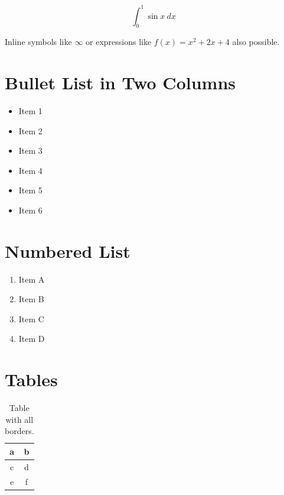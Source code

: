 \documentclass[12pt, a4paper]{book}
\begin{document}
$$\int_0^1{\sin x} \ dx$$

Inline symbols like $\infty$ or expressions like 
$f(x) = x^2 + 2x + 4$ also possible.

\section{Bullet List in Two Columns}

\begin{multicols}{2}
    \begin{itemize}
            \item Item 1
            \item Item 2
            \item Item 3
            \item Item 4
            \item Item 5
            \item Item 6
    \end{itemize}
\end{multicols}


\section{Numbered List}

\begin{enumerate}
    \item Item A
    \item Item B
    \item Item C
    \item Item D
\end{enumerate}

\clearpage

\section{Tables}

\begin{table}[h!]
    \centering
    \begin{tabular}{|c|c|} \hline
        a & b \\ \hline
        c & d \\ \hline
        e & f \\ \hline
    \end{tabular}
    \caption{Table with all borders.}
\end{table}

\vspace{12pt}
\end{document}
